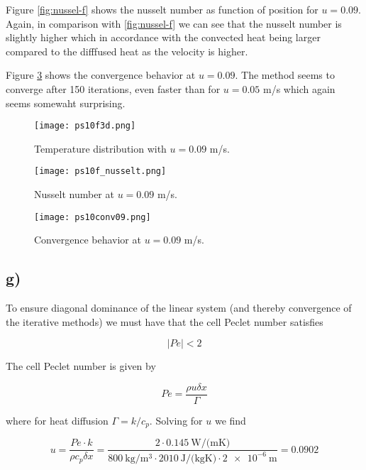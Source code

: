 \documentclass{article}
\begin{document}
Figure \ref{fig:nussel-f} shows the nusselt number as function of position for $u=0.09$. Again, in comparison with \ref{fig:nussel-f} we can see that the nusselt number is slightly higher which in accordance with the convected heat being larger compared to the difffused heat as the velocity is higher.

Figure \ref{fig:conv-f} shows the convergence behavior at $u=0.09$. The method seems to converge after 150 iterations, even faster than for $u=0.05$ m/s which again seems somewaht surprising. 


\begin{figure}
\texttt{[image: ps10f3d.png]}
\caption{Temperature distribution with $u=0.09$ m/s.}
\label{fig:temp-f}
\end{figure}

\begin{figure}
\texttt{[image: ps10f\_nusselt.png]}
\caption{Nusselt number at $u=0.09$ m/s.}
\label{fig:nusselt-f}
\end{figure}

\begin{figure}
\texttt{[image: ps10conv09.png]}
\caption{Convergence behavior at $u=0.09$ m/s.}
\label{fig:conv-f}
\end{figure}

\subsection{g)}
To ensure diagonal dominance of the linear system (and thereby convergence of the iterative methods) we must have that the cell Peclet number satisfies

\begin{equation}
|Pe| < 2
\end{equation}

The cell Peclet number is given by

\begin{equation}
Pe = \frac{\rho u \delta x}{\Gamma}
\end{equation}

where for heat diffusion $\Gamma = k/c_p$. Solving for $u$ we find

\begin{equation}
u = \frac{Pe \cdot  k}{\rho c_p \delta x} = \frac{2\cdot \SI{0.145}{\watt\per(\meter\kelvin)}}{\SI{800}{\kilo\gram\per\meter^3} \cdot \SI{2010}{\joule\per(\kilo\gram\kelvin)} \cdot \SI{2e-6}{\meter}} = 0.0902
\end{equation}
\end{document}

